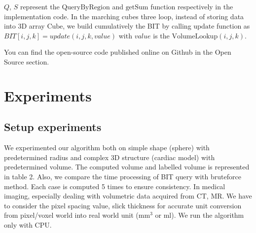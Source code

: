 \documentclass[11pt]{article}
\begin{document}
\begin{multicols}{2}
$Q$, $S$ represent the $\text{QueryByRegion}$ and $\text{getSum}$ function respectively in the implementation code. In the marching cubes three loop, instead of storing data into 3D array $\text{Cube}$, we build cumulatively the BIT by calling $\text{update}$ function as $BIT[i,j,k] = update(i,j,k,value)$ with $value$ is the $\text{VolumeLookup}(i,j,k)$.

You can find the open-source code published online on Github in the Open Source section.

\section{Experiments}
\subsection{Setup experiments}
We experimented our algorithm both on simple shape (sphere) with predetermined radius and complex 3D structure (cardiac model) with predetermined volume. The computed volume and labelled volume is represented in table 2. Also, we compare the time processing of BIT query with bruteforce method. Each case is computed 5 times to ensure consistency. In medical imaging, especially dealing with volumetric data acquired from CT, MR. We have to consider the pixel spacing value, slick thickness for accurate unit conversion from pixel/voxel world into real world unit ($\text{mm}^3$ or $\text{ml}$). We run the algorithm only with CPU. 

\begin{table}[]
    \centering
    \begin{tabular}{c|c|c|c|c|c}
    

\end{tabular}
\end{table}
\end{multicols}
\end{document}
